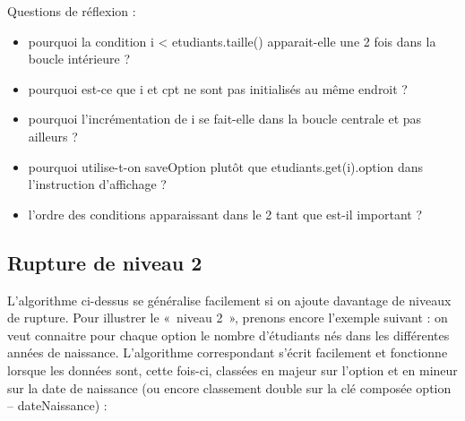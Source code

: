 	\begin{algo}
		\label{algo:rupt1}
	\end{algo}

	\medskip
	Questions de réflexion :
	\begin{itemize}
		\item 
			pourquoi la condition \textsf{i < etudiants.taille()}
			apparait-elle une 2\ieme{} fois dans la boucle intérieure ?
		\item 
			pourquoi est-ce que \textsf{i} et \textsf{cpt} 
			ne sont pas initialisés au même endroit ?
		\item 
			pourquoi l'incrémentation de \textsf{i} se fait-elle dans la boucle centrale 
			et pas ailleurs ?
		\item 
			pourquoi utilise-t-on 
			\textsf{saveOption} plutôt que \textsf{etudiants.get(i).option}
			dans l’instruction d’affichage ?
		\item 
			l’ordre des conditions apparaissant dans le 2\ieme{} \og{}tant que\fg{} 
			est-il important ?
	\end{itemize}

\subsection*{Rupture de niveau 2}

	L’algorithme ci-dessus se généralise facilement si on ajoute davantage de niveaux de rupture. 
	Pour illustrer le «~niveau 2~», prenons encore l’exemple suivant : 
	on veut connaitre pour chaque option le nombre d’étudiants nés dans les différentes années de naissance. 
	L’algorithme correspondant s’écrit facilement et fonctionne lorsque les données sont, cette fois-ci,
	classées en majeur sur l'option et en mineur sur la date de naissance
	(ou encore classement double sur la clé composée option – dateNaissance) :
	
